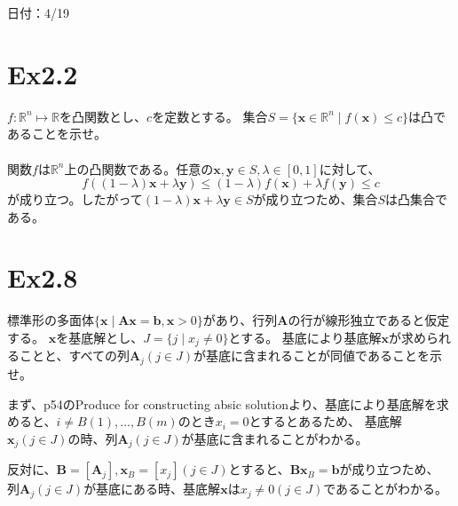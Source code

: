 \documentclass{jsarticle}
\begin{document}
日付：4/19

\section*{Ex2.2}

$f:\mathbb{R}^n \mapsto \mathbb{R}$を凸関数とし、$c$を定数とする。
集合$S = \{\bm{x} \in \mathbb{R}^n \mid f(\bm{x})\leq c\}$は凸であることを示せ。
\\
\\
関数$f$は$\mathbb{R}^n$上の凸関数である。任意の$\bm{x},\bm{y}\in S,\lambda \in [0,1]$に対して、
\begin{equation}
f((1-\lambda)\bm{x}+\lambda\bm{y})\leq(1-\lambda)f(\bm{x})+\lambda f(\bm{y})\leq c
\end{equation}
が成り立つ。したがって$(1-\lambda)\bm{x}+\lambda \bm{y} \in S$が成り立つため、集合$S$は凸集合である。


\newpage

\section*{Ex2.8}

標準形の多面体$\{\bm{x}\mid \bm{Ax} = \bm{b},\bm{x}> 0\}$があり、行列$\bm{A}$の行が線形独立であると仮定する。
$\bm{x}$を基底解とし、$J = \{ j \mid x_j \neq 0\}$とする。 
基底により基底解$\bm{x}$が求められることと、すべての列$\bm{A}_j(j\in J)$が基底に含まれることが同値であることを示せ。
\\
\par
まず、p54のProduce for constructing absic solutionより、基底により基底解を求めると、$i \neq B(1),...,B(m)$のとき$x_i=0$とするとあるため、
基底解$\bm{x}_j(j\in J)$の時、列$\bm{A}_j(j\in J)$が基底に含まれることがわかる。

反対に、$\bm{B}=[\bm{A}_j],\bm{x}_B=[x_j](j \in J)$とすると、$\bm{B}\bm{x}_B=\bm{b}$が成り立つため、
列$\bm{A}_j(j \in J)$が基底にある時、基底解$\bm{x}$は$x_j \neq 0 (j \in J)$であることがわかる。
\end{document}
